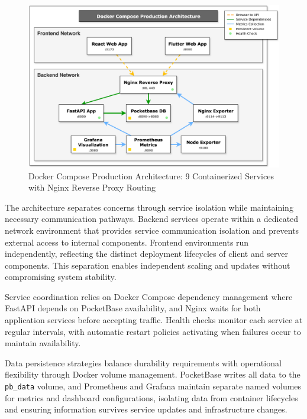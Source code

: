 \begin{figure}[htbp]
    \centering
    \includegraphics[width=\textwidth]{figs/chapter4/docker_architecture_diagram.png}
    \caption[Docker Compose Production Architecture]{Docker Compose Production Architecture: 9 Containerized Services with Nginx Reverse Proxy Routing}
    \label{fig:docker_architecture}
\end{figure}

The architecture separates concerns through service isolation while maintaining necessary communication pathways. Backend services operate within a dedicated network environment that provides service communication isolation and prevents external access to internal components. Frontend environments run independently, reflecting the distinct deployment lifecycles of client and server components. This separation enables independent scaling and updates without compromising system stability.

Service coordination relies on Docker Compose dependency management where FastAPI depends on PocketBase availability, and Nginx waits for both application services before accepting traffic. Health checks monitor each service at regular intervals, with automatic restart policies activating when failures occur to maintain availability.

Data persistence strategies balance durability requirements with operational flexibility through Docker volume management. PocketBase writes all data to the \texttt{pb\_data} volume, and Prometheus and Grafana maintain separate named volumes for metrics and dashboard configurations, isolating data from container lifecycles and ensuring information survives service updates and infrastructure changes.

